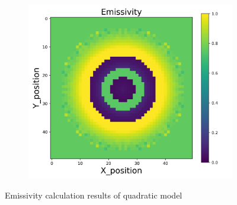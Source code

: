 {\begin{figure}[p]
\begin{minipage}{\textwidth}
\begin{subfigure}{0.325\textwidth}
        \end{subfigure}
        \begin{subfigure}{0.325\textwidth}
            \centering
            \includegraphics[width=\textwidth]{figures/raw_data/33/quad/emi_cal.jpg}
        \end{subfigure}
    \end{minipage}
    \caption{Emissivity calculation results of quadratic model}  
\end{figure}


\newpage
}
